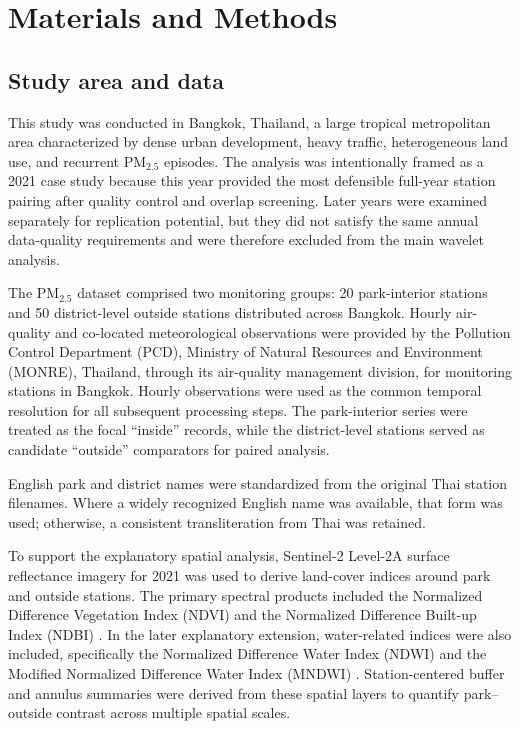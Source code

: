\section{Materials and Methods}

\subsection{Study area and data}

This study was conducted in Bangkok, Thailand, a large tropical metropolitan area characterized by dense urban development, heavy traffic, heterogeneous land use, and recurrent PM$_{2.5}$ episodes. The analysis was intentionally framed as a 2021 case study because this year provided the most defensible full-year station pairing after quality control and overlap screening. Later years were examined separately for replication potential, but they did not satisfy the same annual data-quality requirements and were therefore excluded from the main wavelet analysis.

The PM$_{2.5}$ dataset comprised two monitoring groups: 20 park-interior stations and 50 district-level outside stations distributed across Bangkok. Hourly air-quality and co-located meteorological observations were provided by the Pollution Control Department (PCD), Ministry of Natural Resources and Environment (MONRE), Thailand, through its air-quality management division, for monitoring stations in Bangkok. Hourly observations were used as the common temporal resolution for all subsequent processing steps. The park-interior series were treated as the focal ``inside'' records, while the district-level stations served as candidate ``outside'' comparators for paired analysis.

English park and district names were standardized from the original Thai station filenames. Where a widely recognized English name was available, that form was used; otherwise, a consistent transliteration from Thai was retained.

To support the explanatory spatial analysis, Sentinel-2 Level-2A surface reflectance imagery for 2021 \citep{Drusch2012} was used to derive land-cover indices around park and outside stations. The primary spectral products included the Normalized Difference Vegetation Index (NDVI) \citep{Tucker1979} and the Normalized Difference Built-up Index (NDBI) \citep{Zha2003}. In the later explanatory extension, water-related indices were also included, specifically the Normalized Difference Water Index (NDWI) \citep{McFeeters1996} and the Modified Normalized Difference Water Index (MNDWI) \citep{Xu2006}. Station-centered buffer and annulus summaries were derived from these spatial layers to quantify park--outside contrast across multiple spatial scales.

